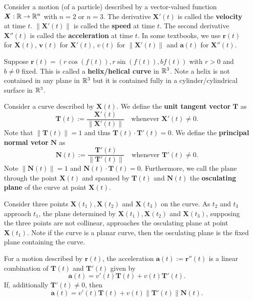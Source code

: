    \begin{definitionenv}
        Consider a motion (of a particle) described by a vector-valued function $\bm X: \mathbb{R} \to \mathbb{R}^n$ with $n=2$ or $n=3$. The derivative $\bm X'(t)$ is called the \textbf{velocity} at time $t$. $\| \bm X'(t)\|$ is called the \textbf{speed} at time $t$. The second derivative $\bm X''(t)$ is called the \textbf{acceleration} at time $t$. In some textbooks, we use $\bm{r}(t)$ for $\bm X(t)$, $\bm{v}(t)$ for $\bm X'(t)$, $v(t)$ for $\| \bm X'(t)\|$ and $\bm{a}(t)$ for $\bm X''(t)$.
    \end{definitionenv}
    \begin{exampleenv}
        Suppose $\bm{r}(t) = (r \cos(f(t)), r \sin(f(t)), bf(t))$ with $r>0$ and $b\ne 0$ fixed. This is called a \textbf{helix/helical curve} in $\mathbb{R}^3$. Note a helix is not contained in any plane in $\mathbb{R}^3$ but it is contained fully in a cylinder/cylindrical surface in $\mathbb{R}^3$.
    \end{exampleenv}
    \begin{definitionenv}
        Consider a curve described by $\bm X(t)$. We define the \textbf{unit tangent vector} $\bm T$ as $$\bm T(t) := \dfrac{\bm X'(t)}{\| \bm X'(t)\|} \quad \text{whenever } \bm X'(t) \ne 0. $$ Note that $\| \bm T(t) \| = 1$ and thus $\bm T(t) \cdot \bm T'(t) = 0$. We define the \textbf{principal normal vetor} $\bm N$ as
        $$ \bm N(t) := \frac{\bm T'(t)}{\| \bm T'(t)\|} \quad \text{whenever } \bm T'(t) \ne 0. $$
        Note $\left\|\bm N(t)\right\| =1$ and $\bm N(t) \cdot \bm T(t) = 0$. Furthermore, we call the plane through the point $\bm X(t)$ and spanned by $\bm T(t)$ and $\bm N(t)$ the \textbf{osculating plane} of the curve at point $\bm X(t)$. 
    \end{definitionenv}
    \begin{remarkenv}
        Consider three points $\bm X(t_1), \bm X(t_2)$ and $\bm X(t_3)$ on the curve. As $t_2 $ and $t_3$ approach $t_1$, the plane determined by $\bm X(t_1), \bm X(t_2)$ and $\bm X(t_3)$, supposing the three points are not collinear, approaches the osculating plane at point $\bm X(t_1)$. Note if the curve is a planar curve, then the osculating plane is the fixed plane containing the curve.
    \end{remarkenv}
    \begin{theoremenv}
        For a motion described by $\bm r(t)$, the acceleration $\bm a(t) := \bm r''(t)$ is a linear combination of $\bm T(t)$ and $\bm T'(t)$ given by $$ \bm a(t) = v'(t) \bm T(t) + v(t) \bm T'(t). $$
        If, additionally $\bm T'(t) \ne 0$, then
        $$ \bm a(t) = v'(t) \bm T(t) + v(t) \| \bm T'(t)\| \bm N(t). $$
    \end{theoremenv}
